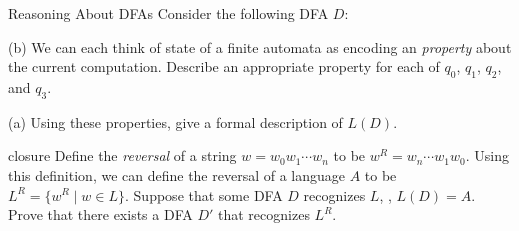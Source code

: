 \documentclass[11pt]{book}
\begin{document}
\begin{problem}{Reasoning About DFAs}
  Consider the following DFA \( D \):
\begin{center}
\end{center}

\noindent (b) We can each think of state of a finite automata as encoding an \emph{property} about the current computation.
  Describe an appropriate property for each of \( q_0 \), \( q_1 \), \( q_2 \), and \( q_3 \).

\vspace{1in}

\noindent (a) Using these properties, give a formal description of \( L(D) \).

\vspace{1in}

\end{problem}


\begin{problem}{closure}
  \turninproblem{} Define the \emph{reversal} of a string \( w = w_0 w_1 \cdots w_n \) to be \( w^R = w_n \cdots w_1 w_0 \).
  Using this definition, we can define the reversal of a language \( A \) to be \( L^R = \{ w^R \;|\; w \in L \} \).
Suppose that some DFA \( D \) recognizes \( L \), \ie, \( L(D) = A \).
Prove that there exists a DFA \( D' \) that recognizes \( L^R \).
\end{problem}
\end{document}
